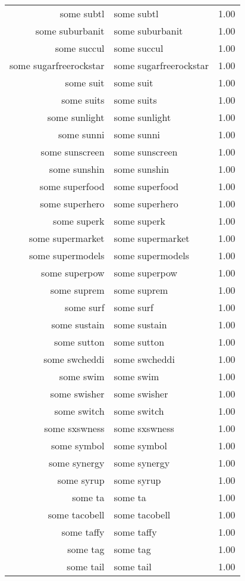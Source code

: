 \begin{table}[ht]
\begin{tabular}{rlr}
  some subtl & some subtl & 1.00 \\ 
  some suburbanit & some suburbanit & 1.00 \\ 
  some succul & some succul & 1.00 \\ 
  some sugarfreerockstar & some sugarfreerockstar & 1.00 \\ 
  some suit & some suit & 1.00 \\ 
  some suits & some suits & 1.00 \\ 
  some sunlight & some sunlight & 1.00 \\ 
  some sunni & some sunni & 1.00 \\ 
  some sunscreen & some sunscreen & 1.00 \\ 
  some sunshin & some sunshin & 1.00 \\ 
  some superfood & some superfood & 1.00 \\ 
  some superhero & some superhero & 1.00 \\ 
  some superk & some superk & 1.00 \\ 
  some supermarket & some supermarket & 1.00 \\ 
  some supermodels & some supermodels & 1.00 \\ 
  some superpow & some superpow & 1.00 \\ 
  some suprem & some suprem & 1.00 \\ 
  some surf & some surf & 1.00 \\ 
  some sustain & some sustain & 1.00 \\ 
  some sutton & some sutton & 1.00 \\ 
  some swcheddi & some swcheddi & 1.00 \\ 
  some swim & some swim & 1.00 \\ 
  some swisher & some swisher & 1.00 \\ 
  some switch & some switch & 1.00 \\ 
  some sxswness & some sxswness & 1.00 \\ 
  some symbol & some symbol & 1.00 \\ 
  some synergy & some synergy & 1.00 \\ 
  some syrup & some syrup & 1.00 \\ 
  some ta & some ta & 1.00 \\ 
  some tacobell & some tacobell & 1.00 \\ 
  some taffy & some taffy & 1.00 \\ 
  some tag & some tag & 1.00 \\ 
  some tail & some tail & 1.00 \\ 

\end{tabular}
\end{table}
